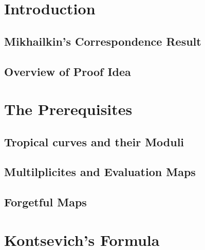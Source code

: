 \section{Introduction}
\subsection{Mikhailkin's Correspondence Result}
\subsection{Overview of Proof Idea}
\section{The Prerequisites}
\subsection{Tropical curves and their Moduli}
\subsection{Multilplicites and Evaluation Maps}
\subsection{Forgetful Maps}
\section{Kontsevich's Formula}
